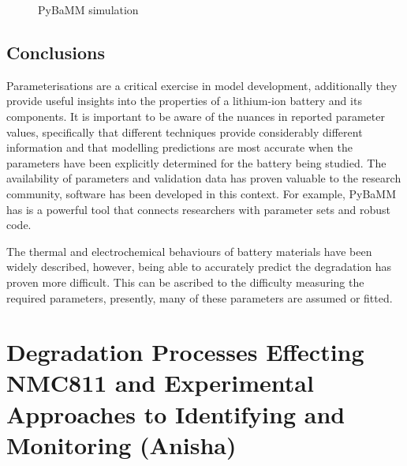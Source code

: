 \documentclass[aps,prb,twocolumn,superscriptaddress,reprint]{revtex4-1}
\begin{document}
\begin{figure}[h]
    \centering
    \caption{\label{fig:pybamm} PyBaMM simulation} 
\end{figure}

\subsection{Conclusions}
Parameterisations are a critical exercise in model development, additionally they provide useful insights into the properties of a lithium-ion battery and its components. It is important to be aware of the nuances in reported parameter values, specifically that different techniques provide considerably different information and that modelling predictions are most accurate when the parameters have been explicitly determined for the battery being studied. The availability of parameters and validation data has proven valuable to the research community, software has been developed in this context. For example, PyBaMM has is a powerful tool that connects researchers with parameter sets and robust code.  

The thermal and electrochemical behaviours of battery materials have been widely described, however, being able to accurately predict the degradation has proven more difficult. This can be ascribed to the difficulty measuring the required parameters, presently, many of these parameters are assumed or fitted. 


\section{Degradation Processes Effecting NMC811 and Experimental Approaches to Identifying and Monitoring (Anisha)}
\end{document}
